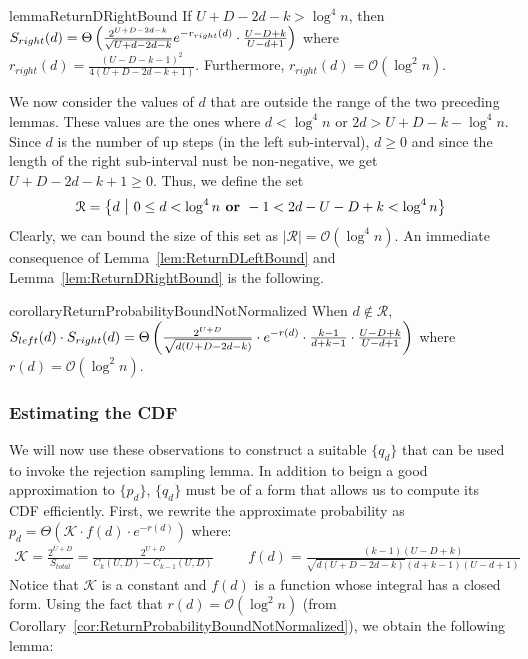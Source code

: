 \begin{restatable}{lemma}{ReturnDRightBound}
\label{lem:ReturnDRightBound}
If $U+D-2d-k > \log^4 n$, then $S_{right}(d)
= \Theta\left( \frac{2^{U+D-2d-k}}{\sqrt{U+d-2d-k}}\mathlarger e^{-r_{right}(d)}\cdot \frac{U-D+k}{U-d+1}\right)$
where $r_{right}(d) = \frac{(U-D-k-1)^2}{4(U+D-2d-k+1)}$.
Furthermore, $r_{right}(d)=\mathcal O(\log^2 n)$.
\end{restatable}

We now consider the values of $d$ that are outside the range of the two preceding lemmas.
These values are the ones where $d < \log^4 n$ or $2d > U+D-k-\log^4 n$.
Since $d$ is the number of up steps (in the left sub-interval), $d \ge 0$
and since the length of the right sub-interval nust be non-negative, we get $U+D-2d-k+1 \ge 0$.
Thus, we define the set
\begin{align}
\label{eq:SetDefinition}
    \mathcal R = \left\{ d\ \mathlarger|\ 0\le d < \log^4 n \textrm{\textbf{\ or\ }} -1 < 2d-U-D+k < \log^4 n \right\}
\end{align}
Clearly, we can bound the size of this set as $|\mathcal R| = \mathcal O(\log^4 n)$.
An immediate consequence of Lemma~\ref{lem:ReturnDLeftBound} and Lemma~\ref{lem:ReturnDRightBound} is the following.

\begin{restatable}{corollary}{ReturnProbabilityBoundNotNormalized}
\label{cor:ReturnProbabilityBoundNotNormalized}
When $d\not \in \mathcal R$,
$S_{left}(d)\cdot S_{right}(d)
= \Theta\left( \frac{2^{U+D}}{\sqrt{d(U+D-2d-k)}}\cdot \mathlarger e^{-r(d)} \cdot \frac{k-1}{d+k-1}\cdot\frac{U-D+k}{U-d+1}\right)$
where $r(d)=\mathcal O(\log^2 n)$.
\end{restatable}



\subsubsection{Estimating the CDF}%
\label{sec:estimating_the_cdf}
We will now use these observations to construct a suitable $\{ q_d\}$ that can be used to invoke the rejection sampling lemma.
In addition to beign a good approximation to $\{ p_d\}$, $\{ q_d\}$ must be of a form that allows us to compute its CDF efficiently.
First, we rewrite the approximate probability as $p_d = \Theta\left(\mathcal K \cdot f(d)\cdot e^{-r(d)}\right)$ where:
\begin{align*}
    \mathcal K = \frac{2^{U+D}}{S_{total}} = \frac{2^{U+D}}{C_k(U,D)-C_{k-1}(U,D)}\ \ \ \
    &&f(d) = \frac{(k-1)(U-D+k)}{\sqrt{d(U+D-2d-k)}(d+k-1)(U-d+1)}
\end{align*}
Notice that $\mathcal K$ is a constant and $f(d)$ is a function whose integral has a closed form.
Using the fact that $r(d) = \mathcal O(\log^2 n)$ (from Corollary~\ref{cor:ReturnProbabilityBoundNotNormalized}), we obtain the following lemma:

